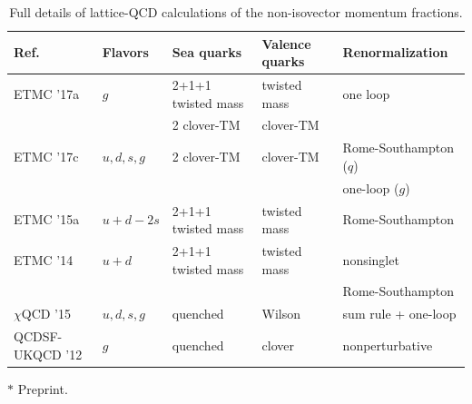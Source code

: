 \begin{table}[!t]
\renewcommand{\arraystretch}{1.2} 
\centering
\footnotesize
\begin{threeparttable}
\begin{tabular}{lllll}
\toprule
Ref. & Flavors & Sea quarks & Valence quarks & Renormalization \\
\midrule

  ETMC '17a \cite{Alexandrou:2016ekb} & $g$
    & 2+1+1 twisted mass & twisted mass & one loop \\
  & & 2 clover-TM & clover-TM & \\

  ETMC '17c \cite{Alexandrou:2017oeh} & $u,d,s,g$
    & 2 clover-TM & clover-TM & Rome-Southampton ($q$)\\
    & & & & one-loop ($g$)\\   
 
  ETMC '15a \cite{Alexandrou:2015qia} &
  $u+d-2s$ &  2+1+1 twisted mass & twisted mass & Rome-Southampton \\

  ETMC '14 \cite{Abdel-Rehim:2013wlz} &
  $u+d$ & 2+1+1 twisted mass & twisted mass & nonsinglet\\ 
  & & & & Rome-Southampton\\

  $\chi$QCD '15 \cite{Deka:2013zha} &
  $u,d,s,g$ & quenched & Wilson & sum rule + one-loop \\

  QCDSF-UKQCD '12 \cite{Horsley:2012pz} &
  $g$ & quenched & clover & nonperturbative \\
\bottomrule
\end{tabular}
\begin{tablenotes}
\scriptsize
\item[$*$] Preprint.
\end{tablenotes}
\end{threeparttable}
\caption{\small Full details of lattice-QCD calculations of the non-isovector 
momentum fractions.}
\label{tab:nonisovectormomfrac}
\end{table}

